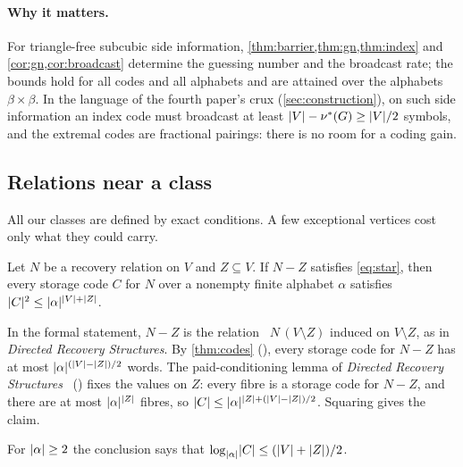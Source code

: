 \paragraph{Why it matters.} For triangle-free subcubic side information, \cref{thm:barrier,thm:gn,thm:index} and
\cref{cor:gn,cor:broadcast} determine the guessing number and the broadcast rate; the bounds hold for all codes and all
alphabets and are attained over the alphabets $\beta\times\beta$. In the language of the fourth paper's crux
(\cref{sec:construction}), on such side information an index code must broadcast at least $\lvert V \rvert-\nu^{*}(G)\ge\lvert V \rvert/2$ symbols, and the extremal codes are fractional pairings: there is no room for a coding gain.

\subsection{Relations near a class}\label{sec:paid}

All our classes are defined by exact conditions. A few exceptional vertices cost only what they could carry.

\begin{corollary}\label{cor:paid}
Let $N$ be a recovery relation on $V$ and $Z\subseteq V$. If $N-Z$ satisfies \eqref{eq:star}, then every storage code
$C$ for $N$ over a nonempty finite alphabet $\alpha$ satisfies $\lvert C \rvert^2\le\lvert \alpha \rvert^{\lvert V \rvert+\lvert Z \rvert}$.
\end{corollary}

\begin{outline}
In the formal statement, $N-Z$ is the relation ~$N\,(V\setminus Z)$ induced
on $V\setminus Z$, as in \emph{Directed Recovery Structures}. By \cref{thm:codes}
(), every storage code for $N-Z$ has at most
$\lvert \alpha \rvert^{(\lvert V \rvert-\lvert Z \rvert)/2}$ words. The paid-conditioning lemma of
\emph{Directed Recovery Structures}~\cite[Lemma~2.2]{DirectedRecovery2026}
() fixes the values on $Z$: every fibre is a storage code for
$N-Z$, and there are at most $\lvert \alpha \rvert^{\lvert Z \rvert}$ fibres, so $\lvert C \rvert\le\lvert \alpha \rvert^{\lvert Z \rvert+(\lvert V \rvert-\lvert Z \rvert)/2}$.
Squaring gives the claim.
\end{outline}

For $\lvert \alpha \rvert\ge2$ the conclusion says that $\log_{\lvert \alpha \rvert}\lvert C \rvert\le(\lvert V \rvert+\lvert Z \rvert)/2$.

